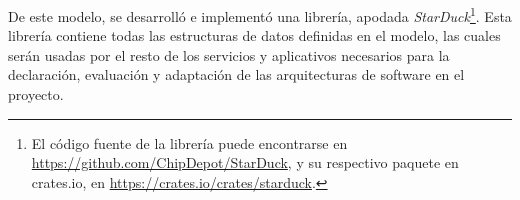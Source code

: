 De este modelo, se desarrolló e implementó una librería, apodada \textit{StarDuck}\footnote{El código fuente de la librería puede encontrarse en \url{https://github.com/ChipDepot/StarDuck}, y su respectivo paquete en crates.io, en \url{https://crates.io/crates/starduck}.}. Esta librería contiene todas las estructuras de datos definidas en el modelo, las cuales serán usadas por el resto de los servicios y aplicativos necesarios para la declaración, evaluación y adaptación de las arquitecturas de software en el proyecto. 
